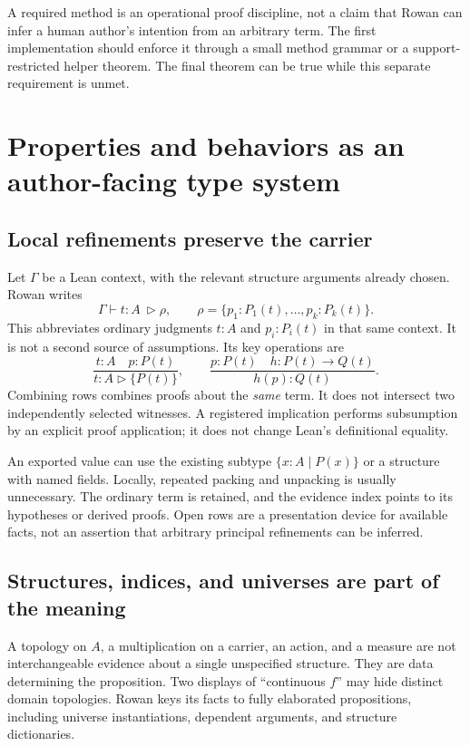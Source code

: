 \documentclass[11pt,letterpaper]{article}
\theoremstyle{definition}\newtheorem{definition}[theorem]{Definition}
\theoremstyle{remark}\newtheorem{remark}[theorem]{Remark}
\begin{document}
A required method is an operational proof discipline, not a claim that Rowan
can infer a human author's intention from an arbitrary term. The first
implementation should enforce it through a small method grammar or a
support-restricted helper theorem. The final theorem can be true while this
separate requirement is unmet.

\section{Properties and behaviors as an author-facing type system}
\label{sec:types}

\subsection{Local refinements preserve the carrier}
Let $\Gamma$ be a Lean context, with the relevant structure arguments already
chosen. Rowan writes
\[
 \Gamma\vdash t:A\ \triangleright\rho,
 \qquad \rho=\{p_1:P_1(t),\ldots,p_k:P_k(t)\}.
\]
This abbreviates ordinary judgments $t:A$ and $p_i:P_i(t)$ in that same
context. It is not a second source of assumptions. Its key operations are
\[
\frac{t:A\quad p:P(t)}{t:A\triangleright\{P(t)\}},\qquad
\frac{p:P(t)\quad h:P(t)\to Q(t)}{h(p):Q(t)}.
\]
Combining rows combines proofs about the \emph{same} term. It does not
intersect two independently selected witnesses. A registered implication
performs subsumption by an explicit proof application; it does not change
Lean's definitional equality.

An exported value can use the existing subtype $\{x:A\mid P(x)\}$ or a
structure with named fields. Locally, repeated packing and unpacking is usually
unnecessary. The ordinary term is retained, and the evidence index points to
its hypotheses or derived proofs. Open rows are a presentation device for
available facts, not an assertion that arbitrary principal refinements can
be inferred.

\subsection{Structures, indices, and universes are part of the meaning}
A topology on $A$, a multiplication on a carrier, an action, and a measure
are not interchangeable evidence about a single unspecified structure. They
are data determining the proposition. Two displays of ``continuous $f$'' may
hide distinct domain topologies. Rowan keys its facts to fully elaborated
propositions, including universe instantiations, dependent arguments, and
structure dictionaries.
\end{document}
